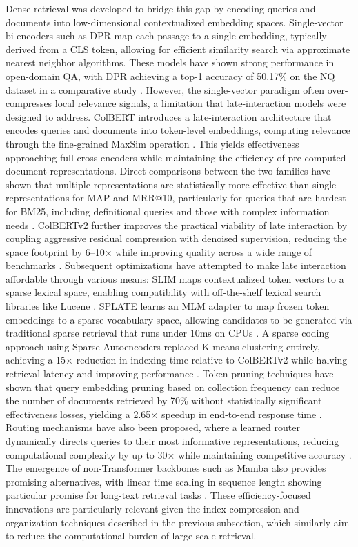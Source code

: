 \documentclass[11pt]{article}
\begin{document}
Dense retrieval was developed to bridge this gap by encoding queries and documents into low-dimensional contextualized embedding spaces. Single-vector bi-encoders such as DPR map each passage to a single embedding, typically derived from a CLS token, allowing for efficient similarity search via approximate nearest neighbor algorithms. These models have shown strong performance in open-domain QA, with DPR achieving a top-1 accuracy of 50.17\% on the NQ dataset in a comparative study \cite{ref103}. However, the single-vector paradigm often over-compresses local relevance signals, a limitation that late-interaction models were designed to address. ColBERT introduces a late-interaction architecture that encodes queries and documents into token-level embeddings, computing relevance through the fine-grained MaxSim operation \cite{ref104}. This yields effectiveness approaching full cross-encoders while maintaining the efficiency of pre-computed document representations. Direct comparisons between the two families have shown that multiple representations are statistically more effective than single representations for MAP and MRR@10, particularly for queries that are hardest for BM25, including definitional queries and those with complex information needs \cite{ref105}. ColBERTv2 further improves the practical viability of late interaction by coupling aggressive residual compression with denoised supervision, reducing the space footprint by 6--10× while improving quality across a wide range of benchmarks \cite{ref106}. Subsequent optimizations have attempted to make late interaction affordable through various means: SLIM maps contextualized token vectors to a sparse lexical space, enabling compatibility with off-the-shelf lexical search libraries like Lucene \cite{ref107}. SPLATE learns an MLM adapter to map frozen token embeddings to a sparse vocabulary space, allowing candidates to be generated via traditional sparse retrieval that runs under 10ms on CPUs \cite{ref108}. A sparse coding approach using Sparse Autoencoders replaced K-means clustering entirely, achieving a 15× reduction in indexing time relative to ColBERTv2 while halving retrieval latency and improving performance \cite{ref109}. Token pruning techniques have shown that query embedding pruning based on collection frequency can reduce the number of documents retrieved by 70\% without statistically significant effectiveness losses, yielding a 2.65× speedup in end-to-end response time \cite{ref110}. Routing mechanisms have also been proposed, where a learned router dynamically directs queries to their most informative representations, reducing computational complexity by up to 30× while maintaining competitive accuracy \cite{ref111}. The emergence of non-Transformer backbones such as Mamba also provides promising alternatives, with linear time scaling in sequence length showing particular promise for long-text retrieval tasks \cite{ref112}. These efficiency-focused innovations are particularly relevant given the index compression and organization techniques described in the previous subsection, which similarly aim to reduce the computational burden of large-scale retrieval.
\end{document}
